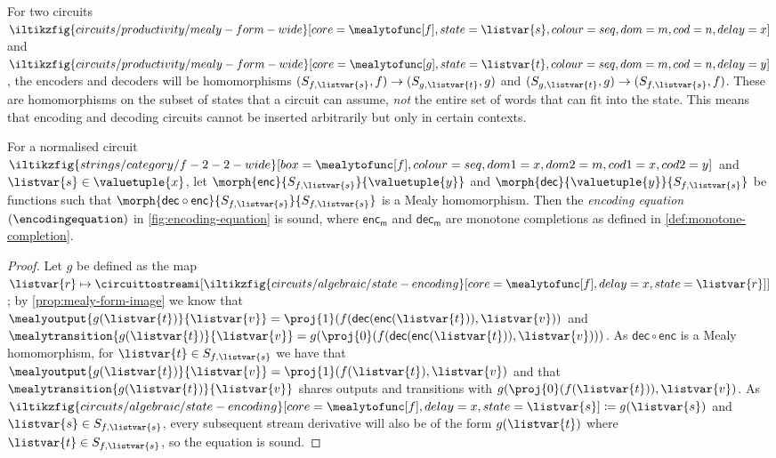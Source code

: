 \documentclass{lmcs}
\begin{document}
For two circuits \(
\iltikzfig{circuits/productivity/mealy-form-wide}[core=\mealytofunc[f],state=\listvar{s},colour=seq,dom=m,cod=n,delay=x]
\) and \(
\iltikzfig{circuits/productivity/mealy-form-wide}[core=\mealytofunc[g],state=\listvar{t},colour=seq,dom=m,cod=n,delay=y]
\), the encoders and decoders will be homomorphisms
\((S_{f,\listvar{s}},f) \to (S_{g,\listvar{t}},g)\)
and
\((S_{g,\listvar{t}},g) \to (S_{f,\listvar{s}},f)\).
These are homomorphisms on the subset of states that a circuit
can assume, \emph{not} the entire set of words that can fit into the state.
This means that encoding and decoding circuits cannot be inserted arbitrarily
but only in certain contexts.

\begin{prop}\label{prop:encoding-equation}
    For a normalised circuit \(
    \iltikzfig{strings/category/f-2-2-wide}[box=\mealytofunc[f],colour=seq,dom1=x,dom2=m,cod1=x,cod2=y]
    \) and \(\listvar{s} \in \valuetuple{x}\), let
    \(\morph{\mathsf{enc}}{S_{f,\listvar{s}}}{\valuetuple{y}}\) and
    \(\morph{\mathsf{dec}}{\valuetuple{y}}{S_{f, \listvar{s}}}\) be functions
    such that \(
    \morph{\mathsf{dec} \circ \mathsf{enc}}{S_{f, \listvar{s}}}{S_{f, \listvar{s}}}
    \) is a Mealy homomorphism.
    Then the \emph{encoding equation} \((\encodingequation)\) in
    \autoref{fig:encoding-equation} is sound, where
    \(\mathsf{enc}_\mathsf{m}\) and \(\mathsf{dec}_\mathsf{m}\) are monotone
    completions as defined in \autoref{def:monotone-completion}.
\end{prop}
\begin{proof}
    Let \(g\) be defined as the map \(\listvar{r} \mapsto
    \circuittostreami[\iltikzfig{circuits/algebraic/state-encoding}[core=\mealytofunc[f],delay=x,state=\listvar{r}]]
    \); by \autoref{prop:mealy-form-image} we know that \(
    \mealyoutput{g(\listvar{t})}{\listvar{v}}
    =
    \proj{1}(f(\mathsf{dec}(\mathsf{enc}(\listvar{t})), \listvar{v}))
    \) and \(
    \mealytransition{g(\listvar{t})}{\listvar{v}}
    =
    g(\proj{0}(f(\mathsf{dec}(\mathsf{enc}(\listvar{t})), \listvar{v})))
    \).
    As \(\mathsf{dec} \circ \mathsf{enc}\) is a Mealy homomorphism, for
    \(\listvar{t} \in S_{f, \listvar{s}}\) we have that \(
    \mealyoutput{g(\listvar{t})}{\listvar{v}}
    =
    \proj{1}(f(\listvar{t}), \listvar{v})
    \) and that \(
    \mealytransition{g(\listvar{t})}{\listvar{v}}
    \) shares outputs and transitions with \(
    g(\proj{0}(f(\listvar{t})), \listvar{v})
    \).
    As \(
    \iltikzfig{circuits/algebraic/state-encoding}[core=\mealytofunc[f],delay=x,state=\listvar{s}]
    \coloneqq
    g(\listvar{s})
    \) and \(\listvar{s} \in S_{f,\listvar{s}}\),
    every subsequent stream derivative will also be of the form
    \(g(\listvar{t})\) where \(\listvar{t} \in S_{f,\listvar{s}}\), so the
    equation is sound.
\end{proof}
\end{document}
